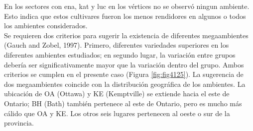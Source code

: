 \begin{itemize}[wide, nosep, labelindent = 0pt, topsep = 1ex, noitemsep,topsep=0pt]
En los sectores con ena, kat y luc en los vértices no se observó ningun ambiente. Esto indica que estos cultivares fueron los menos rendidores en algunos o todos los ambientes considerados.\\

Se requieren dos criterios para sugerir la existencia de diferentes megaambientes (Gauch and Zobel, 1997). Primero, diferentes variedades superiores en los diferentes ambientes estudiados; en segundo lugar, la variación entre grupos debería ser significativamente mayor que la variación dentro del grupo.  Ambos criterios se cumplen en el presente caso (Figura \ref{fig:fig4125}). La sugerencia de dos megaambientes coincide con la distribución geográfica de los ambientes. La ubicación de OA (Ottawa) y KE (Kemptville) se extiende hacia el este de Ontario; BH (Bath) también pertenece al este de Ontario, pero es mucho más cálido que OA y KE. Los otros seis lugares pertenecen al oeste o sur de la provincia.




\end{itemize}
